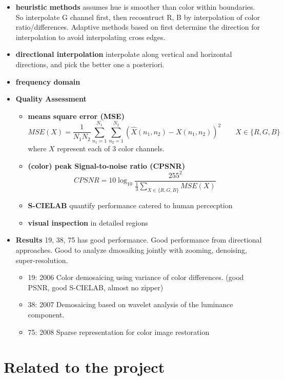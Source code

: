 \documentclass[11pt]{article}
\begin{document}
\begin{itemize}
    \item \textbf{heuristic methods} assumes hue is smoother than color within boundaries. So interpolate G channel first, then recosntruct R, B by interpolation of color ratio/differences. Adaptive methods based on first determine the direction for interpolation to avoid interpolating cross edges.
    \item \textbf{directional interpolation} interpolate along vertical and horizontal directions, and pick the better one a posteriori.
    \item \textbf{frequency domain} 
    \item \textbf{Quality Assessment}
    \begin{itemize}
        \item \textbf{means square error (MSE)}
        \[
            MSE(X) = \frac{1}{N_1 N_2} \sum_{n_1=1}^{N_1} \sum_{n_2=1}^{N_2} 
            \left(
                \hat{X}(n_1, n_2) - X(n_1, n_2)
            \right)^2
            \qquad
            X \in \{R, G, B\}
        \]
        where $X$ represent each of 3 color channels. 
        \item \textbf{(color) peak Signal-to-noise ratio (CPSNR)}
        \[
            CPSNR = 10 \log_{10} \frac{255^2}{\frac{1}{3} \sum_{X\in \{R,G,B\}} MSE(X)}
        \]
        \item \textbf{S-CIELAB} quantify performance catered to human percecption 
        \item \textbf{visual inspection} in detailed regions
    \end{itemize}
    \item \textbf{Results} 19, 38, 75 has good performance. Good performance from directional approaches. Good to analyze dmosaiking jointly with zooming, denoising, super-resolution. 
    \begin{itemize}
        \item 19: 2006 Color demosaicing using variance of color differences. (good PSNR, good S-CIELAB, almost no zipper)
        \item 38: 2007 Demosaicing based on wavelet analysis of the luminance component. 
        \item 75: 2008 Sparse representation for color image restoration 
    \end{itemize}
\end{itemize}



\section{Related to the project}
\end{document}
